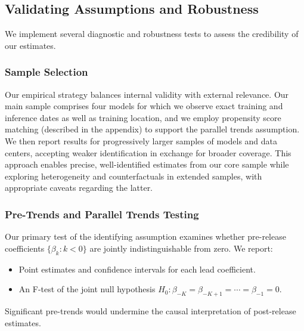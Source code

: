 \documentclass[a4paper,fleqn,longmktitle]{cas-sc}
\theoremstyle{plain}
\theoremstyle{definition}
\begin{document}
\subsection{Validating Assumptions and Robustness}
\label{subsec:robustness}

We implement several diagnostic and robustness tests to assess the credibility of our estimates.

\subsubsection{Sample Selection}

Our empirical strategy balances internal validity with external relevance. Our main sample comprises four models for which we observe exact training and inference dates as well as training location, and we employ propensity score matching (described in the appendix) to support the parallel trends assumption. We then report results for progressively larger samples of models and data centers, accepting weaker identification in exchange for broader coverage. This approach enables precise, well-identified estimates from our core sample while exploring heterogeneity and counterfactuals in extended samples, with appropriate caveats regarding the latter.


\subsubsection{Pre-Trends and Parallel Trends Testing}

Our primary test of the identifying assumption examines whether pre-release coefficients $\{\beta_k : k < 0\}$ are jointly indistinguishable from zero. We report:
\begin{itemize}
    \item Point estimates and confidence intervals for each lead coefficient.
    \item An F-test of the joint null hypothesis $H_0: \beta_{-K} = \beta_{-K+1} = \cdots = \beta_{-1} = 0$.
\end{itemize}
Significant pre-trends would undermine the causal interpretation of post-release estimates.
\end{document}
